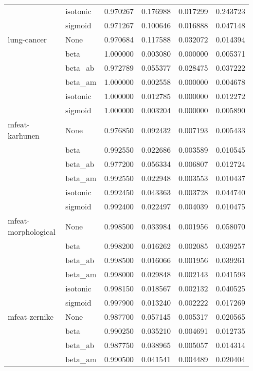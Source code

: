 \begin{tabular}{llrrrr}
        & isotonic &  0.970267 &  0.176988 &  0.017299 &  0.243723 \\
        & sigmoid &  0.971267 &  0.100646 &  0.016888 &  0.047148 \\
lung-cancer & None &  0.970684 &  0.117588 &  0.032072 &  0.014394 \\
        & beta &  1.000000 &  0.003080 &  0.000000 &  0.005371 \\
        & beta\_ab &  0.972789 &  0.055377 &  0.028475 &  0.037222 \\
        & beta\_am &  1.000000 &  0.002558 &  0.000000 &  0.004678 \\
        & isotonic &  1.000000 &  0.012785 &  0.000000 &  0.012272 \\
        & sigmoid &  1.000000 &  0.003204 &  0.000000 &  0.005890 \\
mfeat-karhunen & None &  0.976850 &  0.092432 &  0.007193 &  0.005433 \\
        & beta &  0.992550 &  0.022686 &  0.003589 &  0.010545 \\
        & beta\_ab &  0.977200 &  0.056334 &  0.006807 &  0.012724 \\
        & beta\_am &  0.992550 &  0.022948 &  0.003553 &  0.010437 \\
        & isotonic &  0.992450 &  0.043363 &  0.003728 &  0.044740 \\
        & sigmoid &  0.992400 &  0.022497 &  0.004039 &  0.010475 \\
mfeat-morphological & None &  0.998500 &  0.033984 &  0.001956 &  0.058070 \\
        & beta &  0.998200 &  0.016262 &  0.002085 &  0.039257 \\
        & beta\_ab &  0.998500 &  0.016066 &  0.001956 &  0.039261 \\
        & beta\_am &  0.998000 &  0.029848 &  0.002143 &  0.041593 \\
        & isotonic &  0.998150 &  0.018567 &  0.002132 &  0.040525 \\
        & sigmoid &  0.997900 &  0.013240 &  0.002222 &  0.017269 \\
mfeat-zernike & None &  0.987700 &  0.057145 &  0.005317 &  0.020565 \\
        & beta &  0.990250 &  0.035210 &  0.004691 &  0.012735 \\
        & beta\_ab &  0.987750 &  0.038965 &  0.005057 &  0.014314 \\
        & beta\_am &  0.990500 &  0.041541 &  0.004489 &  0.020404 \\

\end{tabular}
